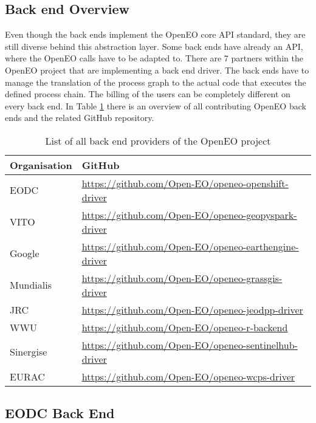 \documentclass[draft,final]{vutinfth} %
\begin{document}
\subsection{Back end Overview}\label{Back end Overview}
Even though the back ends implement the OpenEO core API standard, they are still diverse behind this abstraction layer. Some back ends have already an API, where the OpenEO calls have to be adapted to. There are 7 partners within the OpenEO project that are implementing a back end driver. The back ends have to manage the translation of the process graph to the actual code that executes the defined process chain. The billing of the users can be completely different on every back end. In Table \ref{Tab:backends} there is an overview of all contributing OpenEO back ends and the related GitHub repository. 
\begin{table}[]
	\caption{List of all back end providers of the OpenEO project}
	\begin{tabular}{l|l}
		\textbf{Organisation} & \textbf{GitHub}  \\ \hline
		EODC & \url{https://github.com/Open-EO/openeo-openshift-driver} \\ \hline 
		VITO & \url{https://github.com/Open-EO/openeo-geopyspark-driver} \\ \hline  
		Google  & \url{https://github.com/Open-EO/openeo-earthengine-driver} \\ \hline  
		Mundialis & \url{https://github.com/Open-EO/openeo-grassgis-driver} \\ \hline 
		JRC & \url{https://github.com/Open-EO/openeo-jeodpp-driver} \\ \hline
		WWU & \url{https://github.com/Open-EO/openeo-r-backend} \\ \hline
		Sinergise & \url{https://github.com/Open-EO/openeo-sentinelhub-driver} \\ \hline
		EURAC & \url{https://github.com/Open-EO/openeo-wcps-driver} \\ 
	\end{tabular}
	\label{Tab:backends}
\end{table}

\subsection{EODC Back End}\label{EODC Back End}
\end{document}
